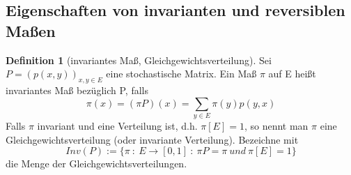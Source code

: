 \documentclass[a4paper,12pt]{scrartcl}
\theoremstyle{definition}
\newtheorem{defi}{Definition}[section]
\begin{document}
\subsection{Eigenschaften von invarianten und reversiblen Maßen}
\begin{defi}[invariantes Maß, Gleichgewichtsverteilung]
Sei $P = (p(x,y))_{x,y \in E}$ eine stochastische Matrix. Ein Maß $\pi$ auf E heißt invariantes Maß bezüglich P, falls
\begin{equation*}
\pi (x) = (\pi P)(x) = \sum_{y \in E} \pi (y) p(y,x)
\end{equation*}
Falls $\pi$ invariant und eine Verteilung ist, d.h. $\pi[E] = 1$, so nennt man $\pi$ eine Gleichgewichtsverteilung (oder invariante Verteilung). Bezeichne mit
\begin{equation*}
Inv(P) := \lbrace \pi \: : \: E \to [0,1] \: : \: \pi P = \pi \: und \: \pi[E] = 1 \rbrace
\end{equation*}
die Menge der Gleichgewichtsverteilungen.
\end{defi}
\clearpairofpagestyles
\ohead{\pagemark}
\pagestyle{scrheadings}
\end{document}
